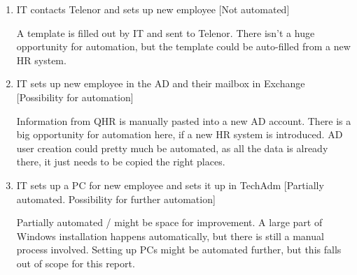 \begin{enumerate}
	\item{IT contacts Telenor and sets up new employee} [Not automated]
	
		A template is filled out by IT and sent to Telenor. There isn't a huge opportunity for automation, but the template could be auto-filled from a new HR system.
	
	\item{IT sets up new employee in the AD and their mailbox in Exchange} [Possibility for automation]
	
		Information from QHR is manually pasted into a new AD account. There is a big opportunity for automation here, if a new HR system is introduced. AD user creation could pretty much be automated, as all the data is already there, it just needs to be copied the right places.
	
	\item{IT sets up a PC for new employee and sets it up in TechAdm} [Partially automated. Possibility for further automation]
	
		Partially automated / might be space for improvement. A large part of Windows installation happens automatically, but there is still a manual process involved.
		Setting up PCs might be automated further, but this falls out of scope for this report.
	
\end{enumerate}